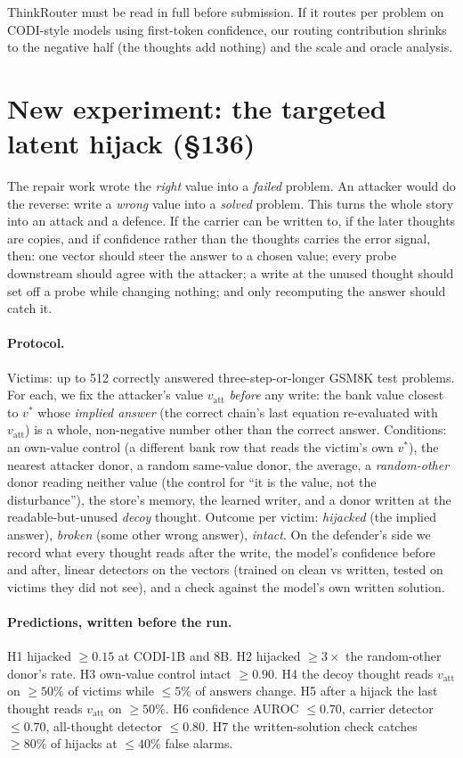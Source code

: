 \documentclass{article}
\begin{document}
ThinkRouter must be read in full before submission. If it routes per problem on CODI-style models using first-token confidence, our routing contribution shrinks to the negative half (the thoughts add nothing) and the scale and oracle analysis.

\section{New experiment: the targeted latent hijack (\S136)}

The repair work wrote the \emph{right} value into a \emph{failed} problem. An attacker would do the reverse: write a \emph{wrong} value into a \emph{solved} problem. This turns the whole story into an attack and a defence. If the carrier can be written to, if the later thoughts are copies, and if confidence rather than the thoughts carries the error signal, then: one vector should steer the answer to a chosen value; every probe downstream should agree with the attacker; a write at the unused thought should set off a probe while changing nothing; and only recomputing the answer should catch it.

\paragraph{Protocol.} Victims: up to 512 correctly answered three-step-or-longer GSM8K test problems. For each, we fix the attacker's value $v_{\text{att}}$ \emph{before} any write: the bank value closest to $v^*$ whose \emph{implied answer} (the correct chain's last equation re-evaluated with $v_{\text{att}}$) is a whole, non-negative number other than the correct answer. Conditions: an own-value control (a different bank row that reads the victim's own $v^*$), the nearest attacker donor, a random same-value donor, the average, a \emph{random-other} donor reading neither value (the control for ``it is the value, not the disturbance''), the store's memory, the learned writer, and a donor written at the readable-but-unused \emph{decoy} thought. Outcome per victim: \emph{hijacked} (the implied answer), \emph{broken} (some other wrong answer), \emph{intact}. On the defender's side we record what every thought reads after the write, the model's confidence before and after, linear detectors on the vectors (trained on clean vs written, tested on victims they did not see), and a check against the model's own written solution.

\paragraph{Predictions, written before the run.} H1 hijacked $\ge 0.15$ at CODI-1B and 8B. H2 hijacked $\ge 3\times$ the random-other donor's rate. H3 own-value control intact $\ge 0.90$. H4 the decoy thought reads $v_{\text{att}}$ on $\ge 50\%$ of victims while $\le 5\%$ of answers change. H5 after a hijack the last thought reads $v_{\text{att}}$ on $\ge 50\%$. H6 confidence AUROC $\le 0.70$, carrier detector $\le 0.70$, all-thought detector $\le 0.80$. H7 the written-solution check catches $\ge 80\%$ of hijacks at $\le 40\%$ false alarms.
\end{document}
